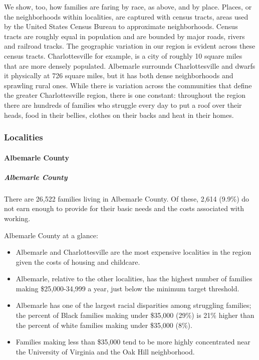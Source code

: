 \documentclass[
]{article}
\begin{document}
We show, too, how families are faring by race, as above, and by place.
Places, or the neighborhoods within localities, are captured with census
tracts, areas used by the United States Census Bureau to approximate
neighborhoods. Census tracts are roughly equal in population and are
bounded by major roads, rivers and railroad tracks. The geographic
variation in our region is evident across these census tracts.
Charlottesville for example, is a city of roughly 10 square miles that
are more densely populated. Albemarle surrounds Charlottesville and
dwarfs it physically at 726 square miles, but it has both dense
neighborhoods and sprawling rural ones. While there is variation across
the communities that define the greater Charlottesville region, there is
one constant: throughout the region there are hundreds of families who
struggle every day to put a roof over their heads, food in their
bellies, clothes on their backs and heat in their homes.

\hypertarget{localities}{%
\subsubsection{Localities}\label{localities}}

\hypertarget{albemarle-county}{%
\paragraph{Albemarle County}\label{albemarle-county}}

\hypertarget{albemarle-county-1}{%
\subparagraph{Albemarle County}\label{albemarle-county-1}}

There are 26,522 families living in Albemarle County. Of these, 2,614
(9.9\%) do not earn enough to provide for their basic needs and the
costs associated with working.

Albemarle County at a glance:

\begin{itemize}
\item
  Albemarle and Charlottesville are the most expensive localities in the
  region given the costs of housing and childcare.
\item
  Albemarle, relative to the other localities, has the highest number of
  families making \$25,000-34,999 a year, just below the minimum target
  threshold.
\item
  Albemarle has one of the largest racial disparities among struggling
  families; the percent of Black families making under \$35,000 (29\%)
  is 21\% higher than the percent of white families making under
  \$35,000 (8\%).
\item
  Families making less than \$35,000 tend to be more highly concentrated
  near the University of Virginia and the Oak Hill neighborhood.
\end{itemize}
\end{document}
